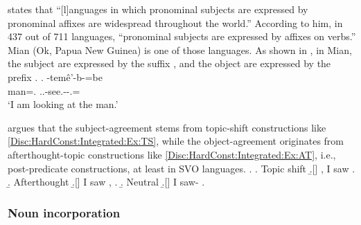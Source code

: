  states that
``[l]anguages in which pronominal subjects are expressed by pronominal affixes are widespread throughout the world.''
According to him,
in 437 out of 711 languages,
``pronominal subjects are expressed by affixes on verbs.''
Mian (Ok, Papua New Guinea) is one of those languages.
As shown in \Next, in Mian,
the subject are expressed by the suffix , and
the object are expressed by the prefix .
%
\exg.
   -tem\^{e}'-b-=be \\
  man=. ..-see.--.= \\
 `I am looking at the man.'
 \hfill{\cite[261]{fedden07}}


 argues that
the subject-agreement stems from topic-shift constructions like \ref{Disc:HardConst:Integrated:Ex:TS},
while the object-agreement originates from afterthought-topic constructions like \ref{Disc:HardConst:Integrated:Ex:AT},
i.e., post-predicate constructions,
at least in SVO languages.
%
\ex.\label{Disc:HardConst:Integrated:Ex:AT}
 \a. Topic shift
 \b.[] , I saw .
 \b. Afterthought
 \b.[] I saw , .
 \b. Neutral
 \b.[] I saw- .




\subsubsection{Noun incorporation}

